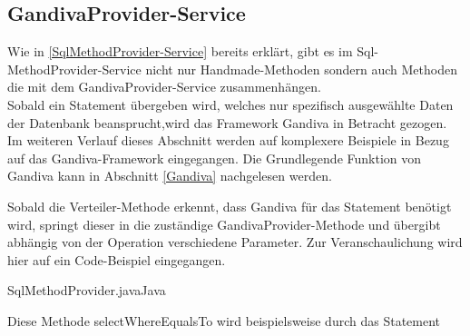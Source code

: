 \subsection{GandivaProvider-Service}
\label{GandivaProvider-Service}

Wie in \ref{SqlMethodProvider-Service} bereits erklärt, gibt es im Sql-MethodProvider-Service nicht nur Handmade-Methoden sondern auch Methoden die mit dem GandivaProvider-Service zusammenhängen.
\\
Sobald ein Statement übergeben wird, welches nur spezifisch ausgewählte Daten der Datenbank beansprucht,wird das Framework Gandiva in Betracht gezogen.
Im weiteren Verlauf dieses Abschnitt werden auf komplexere Beispiele in Bezug auf das Gandiva-Framework eingegangen. Die Grundlegende Funktion von Gandiva kann in Abschnitt \ref{Gandiva} nachgelesen werden.

Sobald die Verteiler-Methode erkennt, dass Gandiva für das Statement benötigt wird, springt dieser in die zuständige GandivaProvider-Methode und übergibt abhängig von der Operation verschiedene Parameter. Zur Veranschaulichung wird hier auf ein Code-Beispiel eingegangen.

\begin{codeblock}{SqlMethodProvider.java}{Java}
  \begin{javacode}
    private IndexResponse selectWhereEqualsTo(String columnName, int value, Table table) throws GandivaException {

        Filter filter = gandivaProvider.equalsTo_NumberFilter(table,columnName,value);

        ArrowRecordBatch batch = gandivaProvider.createBatch(table,columnName);

        SelectionVectorInt32 selectionVectorInt32 = gandivaProvider.createSelectionVector(table);

        filter.evaluate(batch,selectionVectorInt32);

        int[] indices = MemoryUtil.selectionVectorToArray(selectionVectorInt32);

...

  \end{javacode}
\end{codeblock}

Diese Methode selectWhereEqualsTo wird beispielsweise durch das Statement

\begin{center}
\label{Where-Statement}
\end{center}

